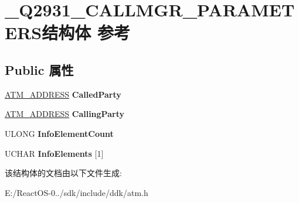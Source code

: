 \hypertarget{struct___q2931___c_a_l_l_m_g_r___p_a_r_a_m_e_t_e_r_s}{}\section{\+\_\+\+Q2931\+\_\+\+C\+A\+L\+L\+M\+G\+R\+\_\+\+P\+A\+R\+A\+M\+E\+T\+E\+R\+S结构体 参考}
\label{struct___q2931___c_a_l_l_m_g_r___p_a_r_a_m_e_t_e_r_s}
\subsection*{Public 属性}
\begin{DoxyCompactItemize}
\item 
\mbox{\label{struct___q2931___c_a_l_l_m_g_r___p_a_r_a_m_e_t_e_r_s_a8cf52cbcede08e72902b089056701f0d}} 
\hyperlink{struct_a_t_m___a_d_d_r_e_s_s}{A\+T\+M\+\_\+\+A\+D\+D\+R\+E\+SS} {\bfseries Called\+Party}
\item 
\mbox{\label{struct___q2931___c_a_l_l_m_g_r___p_a_r_a_m_e_t_e_r_s_a926a2b2fc57260ca244b065e5788aa26}} 
\hyperlink{struct_a_t_m___a_d_d_r_e_s_s}{A\+T\+M\+\_\+\+A\+D\+D\+R\+E\+SS} {\bfseries Calling\+Party}
\item 
\mbox{\label{struct___q2931___c_a_l_l_m_g_r___p_a_r_a_m_e_t_e_r_s_a085302d3e39a66ac4141e148cb58c40a}} 
U\+L\+O\+NG {\bfseries Info\+Element\+Count}
\item 
\mbox{\label{struct___q2931___c_a_l_l_m_g_r___p_a_r_a_m_e_t_e_r_s_abbfa792c263a33a8590e577ee091f7d2}} 
U\+C\+H\+AR {\bfseries Info\+Elements} \mbox{[}1\mbox{]}
\end{DoxyCompactItemize}


该结构体的文档由以下文件生成\+:\begin{DoxyCompactItemize}
\item 
E\+:/\+React\+O\+S-\/0../sdk/include/ddk/atm.\+h\end{DoxyCompactItemize}
